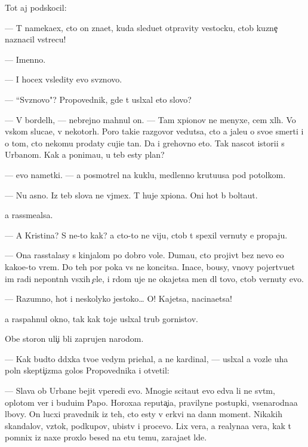 \documentclass[10pt]{book}
\begin{document}
Tot aj podskocil:

— T{\yi} nameka{\y}ex, cto on zna{\y}et, kuda sledu{\y}et otpravity vestocku, ctob{\yi} kuzne{\c} naznacil vstrecu!

— Imenno.

— I hocex v{\yi}sledity {\y}evo sv{\ia}znovo.

— ``Sv{\ia}znovo"? Propovednik, gde t{\yi} usl{\yi}xal eto slovo?

— V bordel{\ia}h, — nebrejno mahnul on. — Tam xpionov ne menyxe, cem xl{\iu}h. Vo vs{\ia}kom sluca{\y}e, v nekotor{\yi}h. Poro{\y} taki{\y}e razgovor{\yi} vedutsa, cto {\y}a jale{\y}u o svo{\y}e{\y} smerti i o tom, cto nekomu prodaty cuji{\y}e ta{\y}n{\yi}. Da i grehovno eto. Tak nascot istori{\y}i s Urbanom. Kak {\y}a ponima{\y}u, u teb{\ia} {\y}esty plan?

— {\Y}evo nametki. — {\Y}a posmotrel na kuklu, medlenno krut{\ia}{\x}u{\y}usa pod potolkom.

— Nu {\y}asno. Iz teb{\ia} slova ne v{\yi}jmex. T{\yi} huje xpiona. Oni hot{\ia} b{\yi} bolta{\y}ut.

{\Y}a rassme{\y}alsa.

— A Kristina? S ne{\y}-to kak? {\Y}a cto-to ne viju, ctob{\yi} t{\yi} spexil vernuty {\y}e{\y} propaju.

— Ona rasstalasy s kinjalom po dobro{\y} vole. Duma{\y}u, cto projiv{\e}t bez nevo {\y}e{\x}o kako{\y}e-to vrem{\ia}. Do teh por poka vs{\e} ne koncitsa. Inace, bo{\y}usy, vnovy pojertvu{\y}et im radi nepon{\ia}tn{\yi}h v{\yi}sxih {\c}ele{\y}, i r{\ia}dom uje ne okajetsa men{\ia} dl{\ia} tovo, ctob{\yi} vernuty {\y}evo.

— Razumno, hot{\ia} i neskolyko jestoko… O! Kajetsa, nacina{\y}etsa!

{\Y}a raspahnul okno, tak kak toje usl{\yi}xal trub{\yi} gornistov.

Obe storon{\yi} uli{\c}i b{\yi}li zaprujen{\yi} narodom.

— Kak budto d{\ia}d{\iu}xka tvo{\y}e{\y} vedym{\yi} pri{\y}ehal, a ne kardinal, — usl{\yi}xal {\y}a vozle uha poln{\yi}{\y} skepti{\c}izma golos Propovednika i otvetil:

— Slava ob Urbane bejit vperedi {\y}evo. Mnogi{\y}e scita{\y}ut {\y}evo {\y}edva li ne sv{\ia}t{\yi}m, oplotom ver{\yi} i budu{\x}im Papo{\y}. Horoxa{\y}a reputa{\c}i{\y}a, pravilyn{\yi}{\y}e postupki, vsenarodna{\y}a l{\iu}bovy. On lucxi{\y} pravednik iz teh, cto {\y}esty v {\C}erkvi na dann{\yi}{\y} moment. Nikakih skandalov, vz{\ia}tok, podkupov, ubi{\y}stv i procevo. Lix vera, a realyna{\y}a vera, kak t{\yi} pomnix iz naxe{\y} proxlo{\y} besed{\yi} na etu temu, zaraja{\y}et l{\iu}de{\y}.
\end{document}
